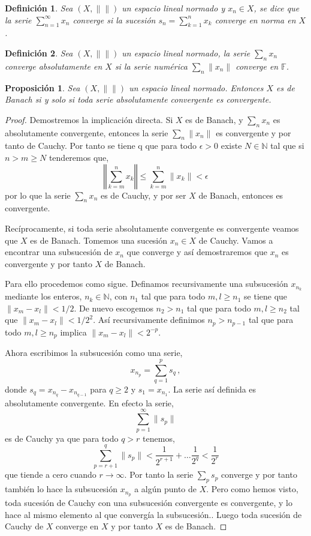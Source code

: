 \documentclass[12pt]{book}
\newtheorem{defn}{\bf Definición}[chapter]
\newtheorem{prop}{\bf Proposición}[chapter]
\def\NN{\mathbb{N}}
\def\FF{\mathbb{F}}
\newcommand{\norm}[1]{\lVert #1\rVert }
\begin{document}
\begin{defn} Sea $(X,\norm{})$  un espacio lineal normado y $x_n\in X$, se dice que la serie $
\sum_{n=1}^\infty x_n $ converge  si la sucesión $s_n=\sum_{k=1}^n x_k$ converge en norma en 
$X$.
\end{defn}
\begin{defn} Sea $(X,\norm{})$ un espacio lineal normado, la serie $\sum_n x_n$ converge 
absolutamente en $X$ si la serie numérica $\sum_{n}\norm{x_n}$ converge en $\FF$.
\end{defn}
\begin{prop}
Sea $(X,\norm{})$ un espacio lineal normado. Entonces $X$ es de Banach si y solo si  toda serie 
absolutamente convergente es convergente.
\end{prop}
\begin{proof}
Demostremos la implicación directa. Si $X$ es de Banach, y $\sum_n x_n $  es absolutamente 
convergente, entonces la serie $\sum_n \norm{x_n}$ es convergente y por tanto de Cauchy. Por 
tanto se tiene q que para todo $\epsilon>0$ existe $N\in \NN$ tal que si $n>m\geq N$ tenderemos 
que,
$$\left\Vert \sum_{k=m}^n x_k\right\Vert \leq \sum_{k=m}^n\norm{x_k}<\epsilon$$
por lo que la serie  $\sum_n x_n$  es de Cauchy, y por ser $X$ de Banach, entonces es 
convergente.


Recíprocamente,  si toda serie absolutamente convergente es convergente veamos que $X$ es de 
Banach. Tomemos una sucesión $x_n\in X$ de Cauchy. Vamos a encontrar una subsucesión de 
$x_n$ que converge y así demostraremos que $x_n$ es convergente y por tanto $X$ de Banach.

Para ello procedemos como sigue. Definamos recursivamente una subsucesión $x_{n_k}$ 
mediante los enteros, $n_{k}\in \NN$, con $n_1$ tal que  para todo $m,l\geq n_{1}$ se tiene que $
\norm{x_m-x_l}<1/2$. De nuevo escogemos $n_{2}>n_{1}$ tal que para todo $m,l\geq n_{2}$ tal 
que $\norm{x_m-x_l}< 1/2^2$. Así recursivamente definimos $n_{p}>n_{p-1}$ tal que para todo 
$m,l\geq n_p $ implica  $\norm{x_m-x_l}<2^{-p}$.

Ahora escribimos la subsucesión como una serie,
$$x_{n_p} = \sum_{q=1}^ps_q\,,$$ 
donde $s_q=x_{n_q}-x_{n_{q-1}}$ para $q\geq 2$ y $s_1=x_{n_1}$. La serie así definida  es 
absolutamente convergente. En efecto  la serie,
$$\sum_{p=1}^\infty \norm{s_p}$$
 es de Cauchy ya que para todo $q>r$ tenemos,
 $$\sum_{p=r+1}^q\norm{s_p} < \frac{1}{2^{r+1}}+\dots \frac{1}{2^q}<\frac{1}{2^r}$$
 que tiende a cero cuando $r\to \infty$.  Por tanto la serie  $\sum_p s_p$ converge y por tanto 
también lo hace la subsucesión  $x_{n_p}$ a algún punto de $X$. Pero como hemos visto, toda 
sucesión de Cauchy con una subsucesión convergente es convergente, y lo hace al mismo 
elemento al que convergía la subsucesión.. Luego toda sucesión de Cauchy  de $X$ converge en 
$X$  y por tanto $X$ es de Banach.
\end{proof} 
\end{document}
